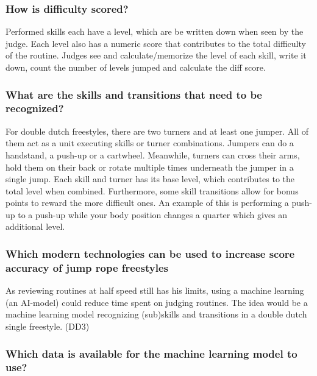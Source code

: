 \subsubsection{How is difficulty scored?}
\label{subsubsec:intro-bp-question-difficulty-scored}

Performed skills each have a level, which are be written down when seen by the judge. Each level also has a numeric score that contributes to the total difficulty of the routine. Judges see and calculate/memorize the level of each skill, write it down, count the number of levels jumped and calculate the diff score.

\subsubsection{What are the skills and transitions that need to be recognized?}
\label{subsubsec:intro-bp-question-what-are-the-skill}

For double dutch freestyles, there are two turners and at least one jumper. All of them act as a unit executing skills or turner combinations. Jumpers can do a handstand, a push-up or a cartwheel. Meanwhile, turners can cross their arms, hold them on their back or rotate multiple times underneath the jumper in a single jump. Each skill and turner has its base level, which contributes to the total level when combined. Furthermore, some skill transitions allow for bonus points to reward the more difficult ones. An example of this is performing a push-up to a push-up while your body position changes a quarter which gives an additional level.

\subsubsection{Which modern technologies can be used to increase score accuracy of jump rope freestyles}
\label{subsubsec:intro-question-integration}

As reviewing routines at half speed still has his limits, using a machine learning (an AI-model) could reduce time spent on judging routines. The idea would be a machine learning model recognizing (sub)skills and transitions in a double dutch single freestyle. (DD3)

\subsubsection{Which data is available for the machine learning model to use?}
\label{subsubsec:intro-question-data}

